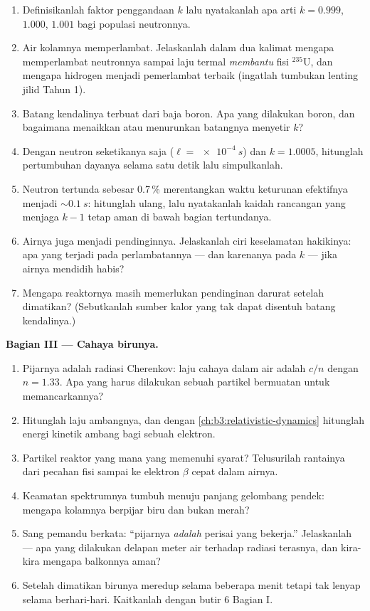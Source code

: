 \begin{problem}
\begin{enumerate}[resume]
  \item Definisikanlah faktor penggandaan $k$ lalu nyatakanlah apa arti
        $k = 0.999$, $1.000$, $1.001$ bagi populasi
        neutronnya.
  \item Air kolamnya memperlambat. Jelaskanlah dalam dua kalimat mengapa
        memperlambat neutronnya sampai laju termal \emph{membantu} fisi
        $^{235}$U, dan mengapa hidrogen menjadi pemerlambat terbaik
        (ingatlah tumbukan lenting jilid Tahun 1).
  \item Batang kendalinya terbuat dari baja boron. Apa yang dilakukan boron, dan
        bagaimana menaikkan atau menurunkan batangnya menyetir $k$?
  \item Dengan neutron seketikanya saja ($\ell = \qty{e-4}{s}$) dan
        $k = 1.0005$, hitunglah pertumbuhan dayanya selama satu detik
        lalu simpulkanlah.
  \item Neutron tertunda sebesar 0.7\,\% merentangkan waktu keturunan
        efektifnya menjadi $\sim\qty{0.1}{s}$: hitunglah ulang, lalu
        nyatakanlah kaidah rancangan yang menjaga $k - 1$ tetap aman di bawah
        bagian tertundanya.
  \item Airnya juga menjadi pendinginnya. Jelaskanlah ciri keselamatan
        hakikinya: apa yang terjadi pada perlambatannya --- dan karenanya
        pada $k$ --- jika airnya mendidih habis?
  \item Mengapa reaktornya masih memerlukan pendinginan darurat setelah
        dimatikan? (Sebutkanlah sumber kalor yang tak dapat disentuh batang
        kendalinya.)
\end{enumerate}

\medskip\noindent\textbf{Bagian III --- Cahaya birunya.}

\begin{enumerate}[resume]
  \item Pijarnya adalah radiasi Cherenkov: laju cahaya dalam air
        adalah $c/n$ dengan $n = 1.33$. Apa yang harus dilakukan sebuah partikel
        bermuatan untuk memancarkannya?
  \item Hitunglah laju ambangnya, dan dengan
        \cref{ch:b3:relativistic-dynamics} hitunglah energi kinetik
        ambang bagi sebuah elektron.
  \item Partikel reaktor yang mana yang memenuhi syarat? Telusurilah rantainya dari
        pecahan fisi sampai ke elektron $\beta$ cepat dalam airnya.
  \item Keamatan spektrumnya tumbuh menuju panjang gelombang pendek:
        mengapa kolamnya berpijar biru dan bukan merah?
  \item Sang pemandu berkata: ``pijarnya \emph{adalah} perisai yang
        bekerja.'' Jelaskanlah --- apa yang dilakukan delapan meter air
        terhadap radiasi terasnya, dan kira-kira mengapa balkonnya aman?
  \item Setelah dimatikan birunya meredup selama beberapa menit tetapi tak
        lenyap selama berhari-hari. Kaitkanlah dengan butir 6 Bagian I.
\end{enumerate}


\end{problem}
